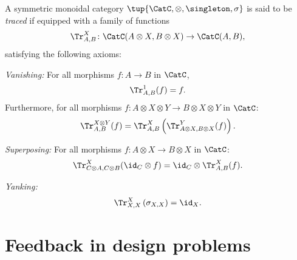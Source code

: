 \begin{shaded}
\begin{definition}
A symmetric monoidal category $\tup{\CatC, \otimes, \singleton, \sigma}$ is said to be \emph{traced} if equipped with a family of functions
\begin{equation}
    \Tr_{A,B}^X\colon \CatC(A\otimes X, B\otimes X)\to \CatC(A,B),
\end{equation}
satisfying the following axioms:
\begin{compactenum}
    \item \emph{Vanishing:} For all morphisms $f\colon A\to B$ in $\CatC$,
    \begin{equation}
    \label{eq:vanishing_1}
    \Tr_{A,B}^1(f)=f.
    \end{equation}
    Furthermore, for all morphisms $f\colon A\otimes X \otimes Y \to B\otimes X \otimes Y$ in $\CatC$:
    \begin{equation}
    \label{eq:vanishing_2}
        \Tr_{A,B}^{X\otimes Y}(f)=\Tr_{A,B}^X\left(
        \Tr_{A\otimes X,B\otimes X}^Y(f)\right).
    \end{equation}
    \item \emph{Superposing:} For all morphisms $f\colon A\otimes X\to B\otimes X$ in $\CatC$:
    \begin{equation}
    \label{eq:superposing}
        \Tr_{C\otimes A,C\otimes B}^{X}(\id_C\otimes f)=\id_C\otimes \Tr_{A,B}^X(f).
    \end{equation}
    \item \emph{Yanking:} 
    \begin{equation}
    \label{eq:yanking}
    \Tr_{X,X}^X\left(\sigma_{X,X}\right)=\id_X.
    \end{equation}
\end{compactenum}
\end{definition}
\end{shaded}

\section{Feedback in design problems}
\label{sec:feedbackindesign}
